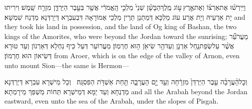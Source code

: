 {וַיִּֽירְשׁ֨וּ אֶת\maqqaf אַרְצ֜וֹ וְאֶת\maqqaf אֶ֣רֶץ \legarmeh  ע֣וֹג מֶֽלֶךְ\maqqaf הַבָּשָׁ֗ן שְׁנֵי֙ מַלְכֵ֣י הָֽאֱמֹרִ֔י אֲשֶׁ֖ר בְּעֵ֣בֶר הַיַּרְדֵּ֑ן מִזְרַ֖ח שָֽׁמֶשׁ׃}
{וִירִיתוּ יָת אַרְעֵיהּ וְיָת אֲרַע עוֹג מַלְכָּא דְּמַתְנַן תְּרֵין מַלְכֵי אֶמוֹרָאָה דִּבְעִבְרָא דְּיַרְדְּנָא מַדְנַח שִׁמְשָׁא׃}
{and they took his land in possession, and the land of Og king of Bashan, the two kings of the Amorites, who were beyond the Jordan toward the sunrising;}{}
{מֵעֲרֹעֵ֞ר אֲשֶׁ֨ר עַל\maqqaf שְׂפַת\maqqaf נַ֧חַל אַרְנֹ֛ן וְעַד\maqqaf הַ֥ר שִׂיאֹ֖ן ה֥וּא חֶרְמֽוֹן׃}
{מֵעֲרוֹעֵר דְּעַל כֵּיף נַחְלָא דְּאַרְנוֹן וְעַד טוּרָא דְּשִׂיאוֹן הוּא חֶרְמוֹן׃}
{from Aroer, which is on the edge of the valley of Arnon, even unto mount Sion—the same is Hermon—}{}

{וְכׇל\maqqaf הָ֨עֲרָבָ֜ה עֵ֤בֶר הַיַּרְדֵּן֙ מִזְרָ֔חָה וְעַ֖ד יָ֣ם הָעֲרָבָ֑ה תַּ֖חַת אַשְׁדֹּ֥ת הַפִּסְגָּֽה׃ \petucha }
{וְכָל מֵישְׁרָא עִבְרָא דְּיַרְדְּנָא מַדְנְחָא וְעַד יַמָּא דְּמֵישְׁרָא תְּחוֹת מַשְׁפַּךְ מֵירָמְתָא׃}
{and all the Arabah beyond the Jordan eastward, even unto the sea of the Arabah, under the slopes of Pisgah.}{}

